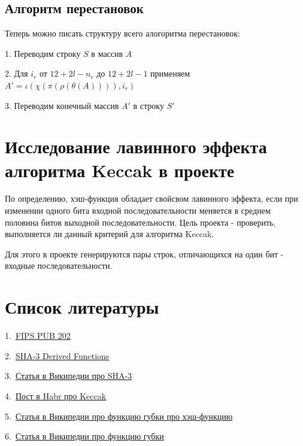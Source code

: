 \documentclass[a4paper,12pt]{article}
\theoremstyle{plain} %
\theoremstyle{definition} %
\theoremstyle{remark} %
\begin{document}
	\subsection{Алгоритм перестановок}
	
	Теперь можно писать структуру всего алогоритма перестановок:
	
	1. Переводим строку $S$ в массив $A$
	
	2. Для $i_r$ от $12 + 2l - n_r$ до $12 + 2l - 1$ применяем $A' = \iota(\chi(\pi(\rho(\theta(A)))), i_r)$
	
	3. Переводим конечный массив $A'$ в строку $S'$
	
	
	
	\section{Исследование лавинного эффекта алгоритма Keccak в проекте}
	
	По определению, хэш-функция обладает свойсвом лавинного эффекта, если при изменении одного бита входной последовательности меняется в среднем половина битов выходной последовательности. Цель проекта - проверить, выполняется ли данный критерий для алгоритма Keccak.
	
	Для этого в проекте генерируются пары строк, отличающихся на один бит - входные последовательности. 
	
	\section{Список литературы}
	
	1.\ \href{https://dx.doi.org/10.6028%2Fnist.fips.202}{FIPS PUB 202}

	
	2.\ \href{https://doi.org/10.6028/NIST.SP.800-185}{SHA-3 Derived Functions}
	
	3.\ \href{https://ru.wikipedia.org/wiki/SHA-3}{Статья в Википедии про SHA-3}
	
	4.\ \href{https://habr.com/ru/post/534082/}{Пост в Habr про Keccak}
	
	5.\ \href{https://ru.wikipedia.org/wiki/Хеш-функция}{Статья в Википедии про функцию губки про хэш-функцию}
	
	6.\ \href{https://ru.wikipedia.org/wiki/Функция_губки}{Статья в Википедии про функцию губки}
	
	
	
	

	

	

	
	
	
	
	
\end{document}
